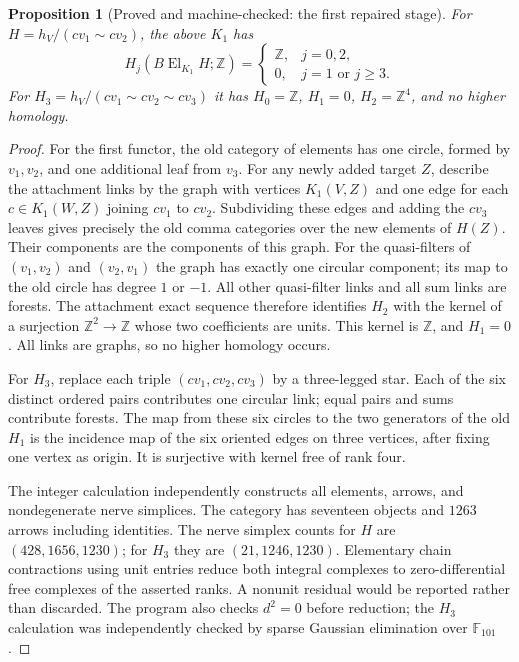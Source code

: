 \documentclass[11pt,a4paper]{article}
\newtheorem{proposition}[theorem]{Proposition}
\theoremstyle{definition}
\begin{document}
\begin{proposition}[Proved and machine-checked: the first repaired stage]\label{C:first-stage}
For $H=h_V/(cv_1\sim cv_2)$, the above $K_1$ has
\[
 H_j(B\operatorname{El}_{K_1}H;\mathbb Z)=
 \begin{cases}\mathbb Z,&j=0,2,\\0,&j=1\text{ or }j\geq3.\end{cases}
\]
For $H_3=h_V/(cv_1\sim cv_2\sim cv_3)$ it has $H_0=\mathbb Z$,
$H_1=0$, $H_2=\mathbb Z^4$, and no higher homology.
\end{proposition}
\begin{proof}
For the first functor, the old category of elements has one circle,
formed by $v_1,v_2$, and one additional leaf from $v_3$.
For any newly added target $Z$, describe the attachment links by the
graph with vertices $K_1(V,Z)$ and one edge for each
$c\in K_1(W,Z)$ joining $cv_1$ to $cv_2$.
Subdividing these edges and adding the $cv_3$ leaves gives precisely
the old comma categories over the new elements of $H(Z)$.
Their components are the components of this graph.
For the quasi-filters of $(v_1,v_2)$ and $(v_2,v_1)$ the graph has
exactly one circular component; its map to the old circle has degree
$1$ or $-1$.  All other quasi-filter links and all sum links are forests.
The attachment exact sequence therefore identifies $H_2$ with the
kernel of a surjection $\mathbb Z^2\to\mathbb Z$ whose two coefficients
are units.  This kernel is $\mathbb Z$, and $H_1=0$.
All links are graphs, so no higher homology occurs.

For $H_3$, replace each triple $(cv_1,cv_2,cv_3)$ by a three-legged star.
Each of the six distinct ordered pairs contributes one circular link;
equal pairs and sums contribute forests.  The map from these six
circles to the two generators of the old $H_1$ is the incidence map
of the six oriented edges on three vertices, after fixing one vertex
as origin.  It is surjective with kernel free of rank four.

The integer calculation independently constructs all elements,
arrows, and nondegenerate nerve simplices.  The category has seventeen
objects and $1263$ arrows including identities.  The nerve simplex
counts for $H$ are $(428,1656,1230)$; for $H_3$ they are
$(21,1246,1230)$.  Elementary chain contractions using unit entries
reduce both integral complexes to zero-differential free complexes
of the asserted ranks.  A nonunit residual would be reported rather
than discarded.  The program also checks $d^2=0$ before reduction;
the $H_3$ calculation was independently checked by sparse Gaussian
elimination over $\mathbb F_{101}$.
\end{proof}
\end{document}
